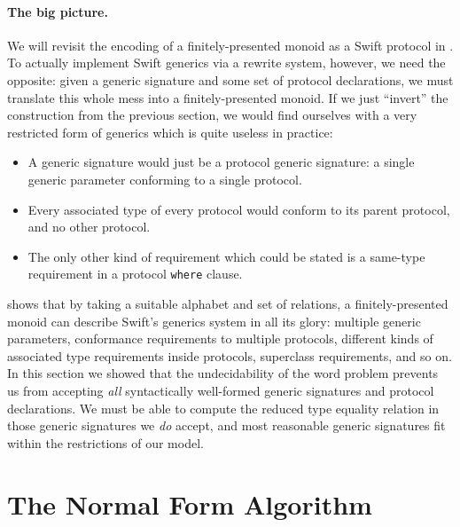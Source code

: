 \documentclass[../generics]{subfiles}
\begin{document}
\paragraph{The big picture.} We will revisit the encoding of a finitely-presented monoid as a Swift protocol in . To actually implement Swift generics via a rewrite system, however, we need the opposite: given a generic signature and some set of protocol declarations, we must translate this whole mess into a finitely-presented monoid. If we just ``invert'' the construction from the previous section, we would find ourselves with a very restricted form of generics which is quite useless in practice:
\begin{itemize}
\item A generic signature would just be a protocol generic signature: a single generic parameter conforming to a single protocol.
\item Every associated type of every protocol would conform to its parent protocol, and no other protocol.
\item The only other kind of requirement which could be stated is a same-type requirement in a protocol \texttt{where} clause.
\end{itemize}
 shows that by taking a suitable alphabet and set of relations, a finitely-presented monoid can describe Swift's generics system in all its glory: multiple generic parameters, conformance requirements to multiple protocols, different kinds of associated type requirements inside protocols, superclass requirements, and so on. In this section we showed that the undecidability of the word problem prevents us from accepting \emph{all} syntactically well-formed generic signatures and protocol declarations. We must be able to compute the reduced type equality relation in those generic signatures we \emph{do} accept, and most reasonable generic signatures fit within the restrictions of our model.

\section{The Normal Form Algorithm}\label{rewritesystemintro}
\end{document}
